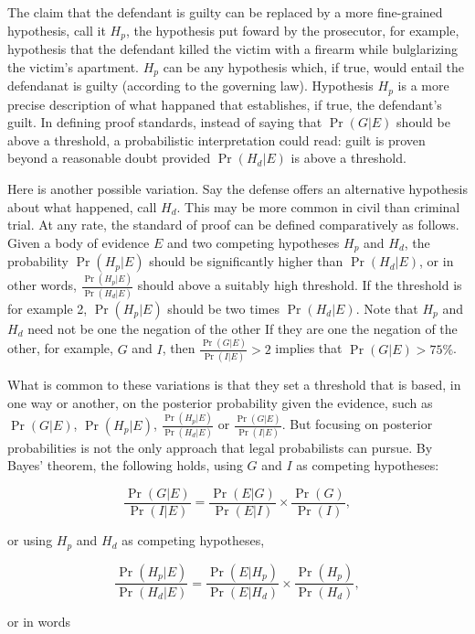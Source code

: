 \documentclass[10pt,dvipsnames,enabledeprecatedfontcommands]{scrartcl}
\begin{document}
The claim that the defendant is guilty can be replaced by a more
fine-grained hypothesis, call it \(H_p\), the hypothesis put foward by
the prosecutor, for example, hypothesis that the defendant killed the
victim with a firearm while bulglarizing\\
the victim's apartment. \(H_p\) can be any hypothesis which, if true,
would entail the defendanat is guilty (according to the governing law).
Hypothesis \(H_p\) is a more precise description of what happaned that
establishes, if true, the defendant's guilt. In defining proof
standards, instead of saying that \(\Pr(G | E)\) should be above a
threshold, a probabilistic interpretation could read: guilt is proven
beyond a reasonable doubt provided \(\Pr(H_d | E)\) is above a
threshold.

Here is another possible variation. Say the defense offers an
alternative hypothesis about what happened, call \(H_d\). This may be
more common in civil than criminal trial. At any rate, the standard of
proof can be defined comparatively as follows. Given a body of evidence
\(E\) and two competing hypotheses \(H_p\) and \(H_d\), the probability
\(\Pr(H_p | E)\) should be significantly higher than \(\Pr(H_d | E)\),
or in other words, \(\frac{\Pr(H_p | E)}{\Pr(H_d | E)}\) should above a
suitably high threshold. If the threshold is for example 2,
\(\Pr(H_p | E)\) should be two times \(\Pr(H_d | E)\). Note that \(H_p\)
and \(H_d\) need not be one the negation of the other If they are one
the negation of the other, for example, \(G\) and \(I\), then
\(\frac{\Pr(G | E)}{\Pr(I | E)}>2\) implies that \(\Pr(G | E)>75\%\).

What is common to these variations is that they set a threshold that is
based, in one way or another, on the posterior probability given the
evidence, such as \(\Pr(G | E)\), \(\Pr(H_p | E)\),
\(\frac{\Pr(H_p | E)}{\Pr(H_d | E)}\) or
\(\frac{\Pr(G | E)}{\Pr(I | E)}\). But focusing on posterior
probabilities is not the only approach that legal probabilists can
pursue. By Bayes' theorem, the following holds, using \(G\) and \(I\) as
competing hypotheses:

\[ \frac{\Pr(G | E)}{\Pr(I | E)} = \frac{\Pr(E | G)}{\Pr(E | I)} \times \frac{\Pr(G)}{\Pr(I)},\]

or using \(H_p\) and \(H_d\) as competing hypotheses,

\[ \frac{\Pr(H_p | E)}{\Pr(H_d | E)} = \frac{\Pr(E | H_p)}{\Pr(E | H_d)} \times \frac{\Pr(H_p)}{\Pr(H_d)},\]

or in words
\end{document}
